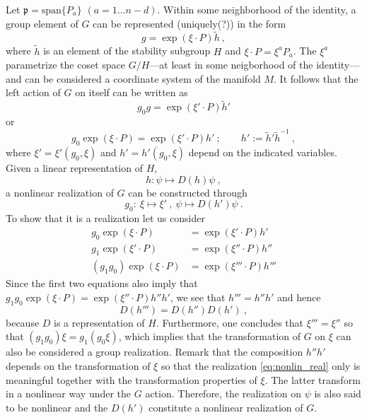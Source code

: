 \documentclass[11pt]{article}
\begin{document}
Let $\mathfrak{p} = \mathrm{span}\{P_a\}$ $(a = 1\ldots n-d)$.  
Within some neighborhood of the identity, a group element of $G$ 
can be represented (uniquely(?)) in the form
%
\begin{displaymath}
	g = \exp(\xi\cdot P) \tilde{h}~,
\end{displaymath}
where $\tilde{h}$ is an element of the stability subgroup $H$ and 
$\xi\cdot P = \xi^a P_a$.  The $\xi^a$ parametrize the coset 
space $G/H$---at least in some neigborhood of the identity---and 
can be considered a coordinate system of the manifold $M$. It 
follows that the left action of $G$ on itself can be written as
%
\begin{displaymath}
	g_0 g = \exp(\xi'\cdot P)\tilde{h}'
\end{displaymath}
or
\begin{equation}\label{eq:left_action_group}
	g_0 \exp(\xi\cdot P) = \exp(\xi'\cdot P)h'~;
	\qquad
	h' := \tilde{h}'\tilde{h}^{-1}~,
\end{equation}
where $\xi'=\xi'(g_0,\xi)$ and $h'=h'(g_0,\xi)$ depend on the 
indicated variables. Given a linear representation of $H$,
\begin{displaymath}
	h: \psi \mapsto D(h)\psi~,
\end{displaymath}
a nonlinear realization of $G$ can be constructed through
\begin{equation}\label{eq:nonlin_real}
	g_0 :~\xi \mapsto \xi'~,~\psi \mapsto D(h')\psi~.
\end{equation}
To show that it is a realization let us consider
%
\begin{align*}
	g_0\exp(\xi\cdot P) &= \exp(\xi'\cdot P) h' \\
	g_1\exp(\xi'\cdot P) &= \exp(\xi''\cdot P) h'' \\
	(g_1g_0)\exp(\xi\cdot P) &= \exp(\xi'''\cdot P) h'''
\end{align*}
Since the first two equations also imply that
$g_1g_0\exp(\xi\cdot P) = \exp(\xi''\cdot P)h''h'$, we see that 
$h''' = h''h'$ and hence
%
\begin{displaymath}
	D(h''') = D(h'')D(h')~,
\end{displaymath}
because $D$ is a representation of $H$. Furthermore, one 
concludes that $\xi''' = \xi''$ so that $(g_1g_0)\xi = 
g_1(g_0\xi)$, which implies that the transformation of $G$ on 
$\xi$ can also be considered a group realization. Remark that the 
composition $h''h'$ depends on the transformation of $\xi$ so 
that the realization \eqref{eq:nonlin_real} only is meaningful 
together with the transformation properties of $\xi$. {\blu The 
	latter transform in a nonlinear way under the $G$ action.  
	Therefore, the realization on $\psi$ is also said to be 
	nonlinear and the $D(h')$ constitute a nonlinear realization 
	of $G$.}
\end{document}
